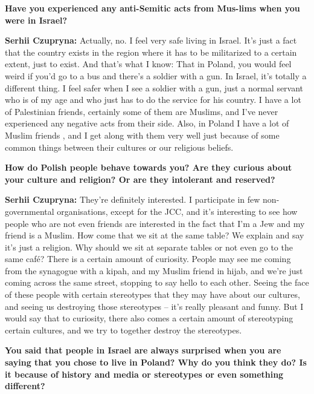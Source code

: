 \textbf{Have you experienced any anti-Semitic acts from Mus-lims when you were in Israel?}\par
\textbf{Serhii Czupryna:} Actually, no. I feel very safe living in Israel. It’s just a fact that the country exists in the region where it has to be militarized to a certain extent, just to exist. And that’s what I know: That in Poland, you would feel weird if you’d go to a bus and there’s a soldier with a gun. In Israel, it’s totally a different thing. I feel safer when I see a soldier with a gun, just a normal servant who is of my age and who just has to do the service for his country. I have a lot of Palestinian friends, certainly some of them are Muslims, and I’ve never experienced any negative acts from their side. Also, in Poland I have a lot of Muslim friends , and I get along with them very well just because of some common things between their cultures or our religious beliefs. \par 
\textbf{How do Polish people behave towards you? Are they curious about your culture and religion? Or are they intolerant and reserved?}\par
\textbf{Serhii Czupryna:} They’re definitely interested. I participate in few non-governmental organisations, except for the JCC, and it’s interesting to see how people who are not even friends are interested in the fact that I’m a Jew and my friend is a Muslim. How come that we sit at the same table? We explain and say it’s just a religion. Why should we sit at separate tables or not even go to the same café? There is a certain amount of curiosity. People may see me coming from the synagogue with a kipah, and my Muslim friend in hijab, and we’re just coming across the same street, stopping to say hello to each other. Seeing the face of these people with certain stereotypes that they may have about our cultures, and seeing us destroying those stereotypes – it’s really pleasant and funny. But I would say that to curiosity, there also comes a certain amount of stereotyping certain cultures, and we try to together destroy the stereotypes.\par 
\textbf{You said that people in Israel are always surprised when you are saying that you chose to live in Poland? Why do you think they do? Is it because of history and media or stereotypes or even something different?}\par
